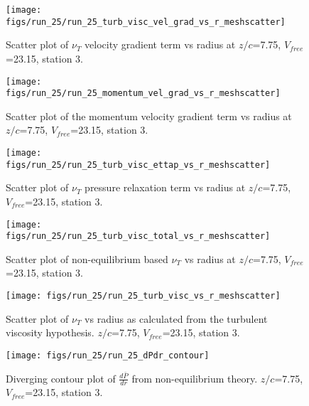 \begin{figure}[H]
\centering
\texttt{[image: figs/run\_25/run\_25\_turb\_visc\_vel\_grad\_vs\_r\_meshscatter]}
\caption{Scatter plot of $\nu_T$ velocity gradient term vs radius at $z/c$=7.75, $V_{free}$=23.15, station 3.}
\end{figure}


\begin{figure}[H]
\centering
\texttt{[image: figs/run\_25/run\_25\_momentum\_vel\_grad\_vs\_r\_meshscatter]}
\caption{Scatter plot of the momentum velocity gradient term vs radius at $z/c$=7.75, $V_{free}$=23.15, station 3.}
\end{figure}


\begin{figure}[H]
\centering
\texttt{[image: figs/run\_25/run\_25\_turb\_visc\_ettap\_vs\_r\_meshscatter]}
\caption{Scatter plot of $\nu_T$ pressure relaxation term vs radius at $z/c$=7.75, $V_{free}$=23.15, station 3.}
\end{figure}


\begin{figure}[H]
\centering
\texttt{[image: figs/run\_25/run\_25\_turb\_visc\_total\_vs\_r\_meshscatter]}
\caption{Scatter plot of non-equilibrium based $\nu_T$ vs radius at $z/c$=7.75, $V_{free}$=23.15, station 3.}
\end{figure}


\begin{figure}[H]
\centering
\texttt{[image: figs/run\_25/run\_25\_turb\_visc\_vs\_r\_meshscatter]}
\caption{Scatter plot of $\nu_T$ vs radius as calculated from the turbulent viscosity hypothesis. $z/c$=7.75, $V_{free}$=23.15, station 3.}
\end{figure}


\begin{figure}[H]
\centering
\texttt{[image: figs/run\_25/run\_25\_dPdr\_contour]}
\caption{Diverging contour plot of $\frac{d\bar{P}}{dr}$ from non-equilibrium theory. $z/c$=7.75, $V_{free}$=23.15, station 3.}
\end{figure}


